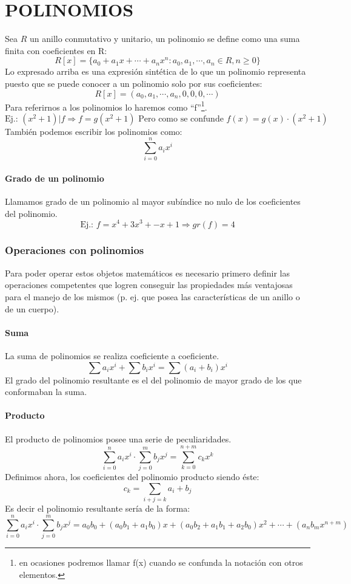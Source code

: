 \documentclass[10pt,a4paper,openright]{book}
\theoremstyle{break}
\begin{document}
\chapter*{POLINOMIOS}
Sea $R$ un anillo conmutativo y unitario, un polinomio se define como una suma finita con coeficientes en R:
$$R[x]=\{a_0+a_1x+\cdots+a_nx^n : a_0,a_1,\cdots,a_n\in R, n\geq 0\}$$
Lo expresado arriba es una expresión sintética de lo que un polinomio representa puesto que se puede conocer a un polinomio solo por sus coeficientes:
$$R[x]=(a_0,a_1,\cdots,a_n,0,0,0,\cdots)$$
Para referirnos a los polinomios lo haremos como ``f''\footnote{en ocasiones podremos llamar f(x) cuando se confunda la notación con otros elementos.}.
$$\mbox{Ej.: } (x^2+1)|f\Rightarrow f=g(x^2+1) \mbox{ Pero como se confunde } f(x)=g(x)\cdot (x^2+1)$$
También podemos escribir los polinomios como:
$$\sum_{i=0}^{n} a_ix^i$$

\subsubsection*{Grado de un polinomio}
Llamamos grado de un polinomio al mayor subíndice no nulo de los coeficientes del polinomio.
$$\mbox{Ej.: } f=x^4+3x^3+-x+1 \Rightarrow gr(f)=4$$

\subsection{Operaciones con polinomios}
Para poder operar estos objetos matemáticos es necesario primero definir las operaciones competentes que logren conseguir las propiedades más ventajosas para el manejo de los mismos (p. ej. que posea las características de un anillo o de un cuerpo).
\subsubsection*{Suma}
La suma de polinomios se realiza coeficiente a coeficiente.
$$\sum a_ix^i+\sum b_ix^i=\sum (a_i+b_i)x^i$$
El grado del polinomio resultante es el del polinomio de mayor grado de los que conformaban la suma.

\subsubsection*{Producto}
El producto de polinomios posee una serie de peculiaridades.
$$\sum_{i=0}^n a_ix^i\cdot \sum_{j=0}^m b_jx^j=\sum_{k=0}^{n+m} c_kx^k$$
Definimos ahora, los coeficientes del polinomio producto siendo éste:
$$c_k=\sum_{i+j=k} a_i+b_j$$
Es decir el polinomio resultante sería de la forma:
$$\sum_{i=0}^n a_ix^i\cdot \sum_{j=0}^m b_jx^j=a_0b_0+(a_0b_1+a_1b_0)x+(a_0b_2+a_1b_1+a_2b_0)x^2+\cdots+(a_nb_mx^{n+m})$$
\end{document}
